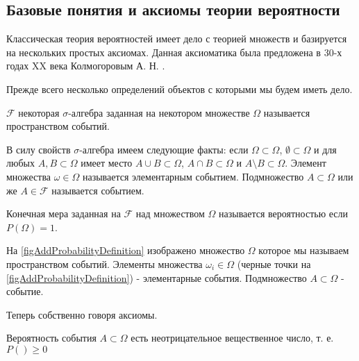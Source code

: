 \subsection{Базовые понятия и аксиомы теории вероятности}

Классическая теория вероятностей имеет дело с теорией множеств и
базируется на нескольких простых аксиомах. Данная аксиоматика была
предложена в 30-х годах XX века Колмогоровым
А. Н. \cite{bKolmogorov74basic}. 

Прежде всего несколько определений объектов с которыми мы будем иметь
дело. 

\begin{definition}
\label{def:events_set}  
  $\mathcal{F}$ некоторая $\sigma$-алгебра заданная на некотором
множестве $\Omega$ называется пространством событий. 
\end{definition}

\begin{remark}
  В силу свойств $\sigma$-алгебра имеем следующие факты: если
  $\Omega \subset \Omega$, $\emptyset \subset \Omega$ и для любых
  $A,B \subset \Omega$ имеет место
  $A \cup B \subset \Omega$, $A \cap B \subset \Omega$ и
  $A \setminus B \subset \Omega$.  Элемент множества
  $\omega \in \Omega$ называется элементарным событием. Подмножество 
  $A \subset \Omega$ или же $A \in \mathcal{F}$ называется событием.
\end{remark}

\begin{definition}[Вероятность $P$]
  \label{def:probability}
  Конечная мера заданная на $\mathcal{F}$ над множеством $\Omega$
  называется вероятностью если $P\left(\Omega\right) = 1$.
\end{definition}

\begin{example}

На \autoref{figAddProbabilityDefinition} изображено множество
$\Omega$ которое мы называем пространством событий. Элементы
множества $\omega_i \in \Omega$ (черные точки на
\autoref{figAddProbabilityDefinition}) - элементарные
события. Подмножество $A \subset \Omega$ - событие.
\end{example}

Теперь собственно говоря аксиомы.

\begin{axiom}[Не-отрицательность]
  \label{axProbabilityKolmogorovNonNegativity}
  Вероятность события $A \subset \Omega$ есть неотрицательное
  вещественное число, т. е. $P\left(\right) \ge 0$
\end{axiom}

